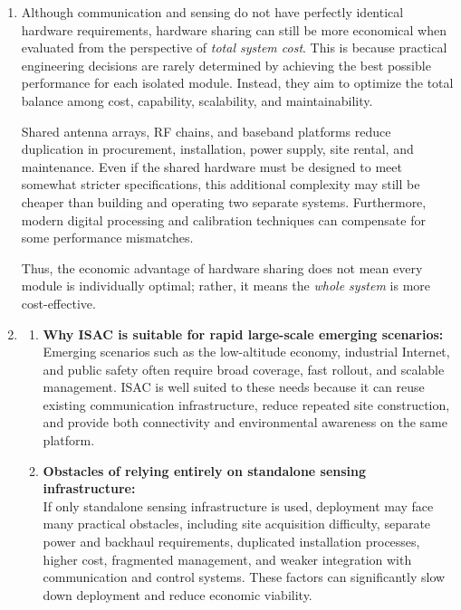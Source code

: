 \begin{enumerate}[label=\textbf{\arabic*.}, leftmargin=*]
    Therefore, Scheme B is generally recommended for large-scale urban deployment, especially where communication infrastructure is already available. Scheme A may still be suitable for locations requiring highly specialized radar performance.

    \item 
    Although communication and sensing do not have perfectly identical hardware requirements, hardware sharing can still be more economical when evaluated from the perspective of \emph{total system cost}. This is because practical engineering decisions are rarely determined by achieving the best possible performance for each isolated module. Instead, they aim to optimize the total balance among cost, capability, scalability, and maintainability.

    Shared antenna arrays, RF chains, and baseband platforms reduce duplication in procurement, installation, power supply, site rental, and maintenance. Even if the shared hardware must be designed to meet somewhat stricter specifications, this additional complexity may still be cheaper than building and operating two separate systems. Furthermore, modern digital processing and calibration techniques can compensate for some performance mismatches.

    Thus, the economic advantage of hardware sharing does not mean every module is individually optimal; rather, it means the \emph{whole system} is more cost-effective.

    \item 
    \begin{enumerate}[label=(\alph*)]
        \item \textbf{Why ISAC is suitable for rapid large-scale emerging scenarios:} \\
        Emerging scenarios such as the low-altitude economy, industrial Internet, and public safety often require broad coverage, fast rollout, and scalable management. ISAC is well suited to these needs because it can reuse existing communication infrastructure, reduce repeated site construction, and provide both connectivity and environmental awareness on the same platform.

        \item \textbf{Obstacles of relying entirely on standalone sensing infrastructure:} \\
        If only standalone sensing infrastructure is used, deployment may face many practical obstacles, including site acquisition difficulty, separate power and backhaul requirements, duplicated installation processes, higher cost, fragmented management, and weaker integration with communication and control systems. These factors can significantly slow down deployment and reduce economic viability.
    \end{enumerate}


\end{enumerate}
